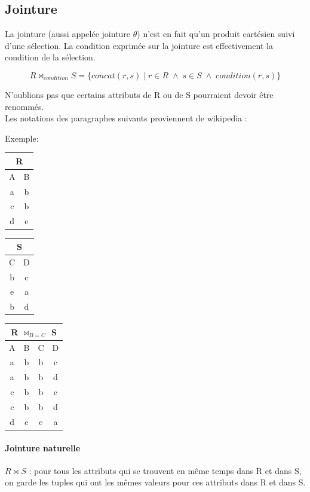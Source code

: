 \documentclass[a4paper]{article}
\begin{document}
  \subsection{Jointure}
  La jointure (aussi appelée jointure $\theta$) n'est en fait qu'un produit cartésien suivi d'une sélection. 
  La condition exprimée sur la jointure est effectivement la condition de la sélection.

  $$R \bowtie_{condition} S = \{concat(r,s)\; |\; r \in R\; \land \; s \in S\; \land \; condition(r,s)\} $$

  N'oublions pas que certains attributs de R ou de S pourraient devoir être renommés.\\

  Les notations des paragraphes suivants proviennent de wikipedia :
  
  Exemple:
  \begin{tabular}{|c|c|}
	\multicolumn{2}{c}{R}\\
	\hline
	A & B\\
	\hline\hline
	a & b\\
	c & b\\
	d & e\\
	\hline
  \end{tabular}
  \begin{tabular}{|c|c|}
	\multicolumn{2}{c}{S}\\
	\hline
	C & D\\
	\hline\hline
	b & c\\
	e & a\\
	b & d\\
	\hline
  \end{tabular}
  \begin{tabular}{|c|c|c|c|}
	\multicolumn{4}{c}{\textcolor[rgb]{1,0,0}{R $\bowtie_{B=C}$ S}}\\
	\hline
	A & B & C & D\\
	\hline\hline
	a & b & b & c\\
	a & b & b & d\\
	c & b & b & c\\
	c & b & b & d\\
	d & e & e & a\\
	\hline
  \end{tabular}

  \paragraph{Jointure naturelle} $R \bowtie S$ : pour tous les attributs qui se trouvent en même temps dans R et dans S, on garde les tuples qui ont les mêmes 
  valeurs pour ces attributs dans R et dans S.
  
\end{document}
